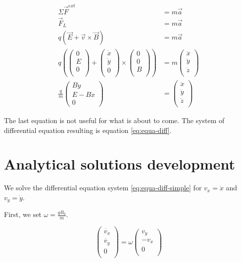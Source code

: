 \documentclass[a4paper,12pt,twoside]{article}
\begin{document}
\begin{align*}
	\Sigma\vec{F}^{ext} &= m\vec{a} \\
	\vec{F}_L &= m\vec{a}\\
	q(\vec{E} + \vec{v}\times\vec{B}) &= m\vec{a} \\
	q\left( \begin{pmatrix} 0\\ E\\ 0\\ \end{pmatrix} + \begin{pmatrix} \dot{x}\\ \dot{y}\\ 0\\ \end{pmatrix} \times \begin{pmatrix} 0\\ 0\\ B\\ \end{pmatrix}\right) &= m\begin{pmatrix} \ddot{x}\\ \ddot{y}\\ \ddot{z}\\ \end{pmatrix} \\
	\frac{q}{m}\begin{pmatrix} B\dot{y}\\ E - B\dot{x}\\ 0 \end{pmatrix} &= \begin{pmatrix} \ddot{x}\\ \ddot{y}\\ \ddot{z}\\ \end{pmatrix}
\end{align*}

The last equation is not useful for what is about to come.
The system of differential equation resulting is equation \ref{eq:equa-diff}.

\section{Analytical solutions development} \label{ann:dev-sol-ana}
We solve the differential equation system \ref{eq:equa-diff-simple} for $v_x = \dot{x}$ and $v_y = \dot{y}$.

First, we set $\omega = \frac{qB_0}{m}$.

\begin{equation*}
	\begin{pmatrix} \dot{v_x}\\ \dot{v_y}\\ 0\\ \end{pmatrix} = \omega \begin{pmatrix} v_y\\ -v_x\\ 0\\ \end{pmatrix}
\end{equation*}
\end{document}
